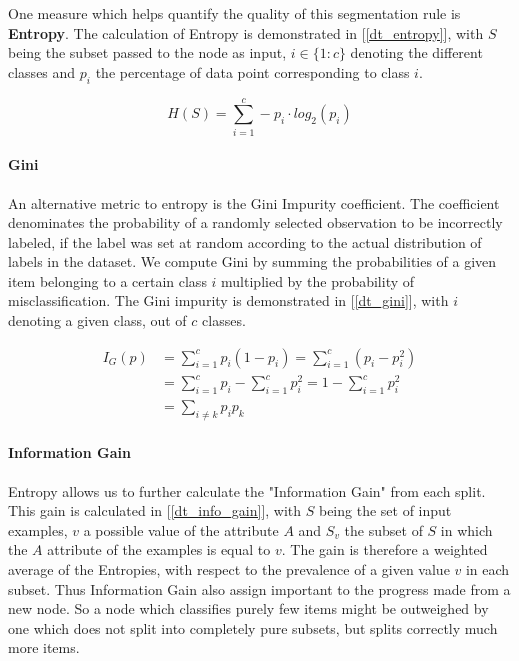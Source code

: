 		\par
		One measure which helps quantify the quality of this segmentation rule is \textbf{Entropy}. The calculation of Entropy is demonstrated in [\ref{dt_entropy}], with $ S $ being the subset passed to the node as input, $ i \in \{1:c \} $ denoting the different classes and $ p_i $ the percentage of data point corresponding to class $ i $. 
		
		\begin{equation}
			H(S) = \sum_{i=1}^c - p_i \cdot log_2 (p_i)
			\label{dt_entropy}
		\end{equation}
		
	 \paragraph{Gini}
	 	An alternative metric to entropy is the Gini Impurity coefficient. The coefficient denominates the probability of a randomly selected observation to be incorrectly labeled, if the label was set at random according to the actual distribution of labels in the dataset. We compute Gini by summing the probabilities of a given item belonging to a certain class $ i $ multiplied by the probability of misclassification. The Gini impurity is demonstrated in [\ref{dt_gini}], with $ i $ denoting a given class, out of $ c $ classes.
	 	
	 \begin{equation}
	 	\begin{aligned}
		 	I_G(p) &= \sum_{i=1}^c p_i(1-p_i) = \sum_{i=1}^c (p_i-p_i^2) \\  &=\sum_{i=1}^c p_i - \sum_{i=1}^c p_i^2 = 1 - \sum_{i=1}^c p_i^2 \\ &= \sum_{i \neq k} p_i p_k
	 	\end{aligned}
		\label{dt_gini}
	 \end{equation}
	 
	 \paragraph{Information Gain}	
	 	Entropy allows us to further calculate the "Information Gain" from each split. This gain is calculated in [\ref{dt_info_gain}], with $ S $ being the set of input examples, $ v $ a possible value of the attribute $ A $ and $ S_v $ the subset of $ S $ in which the $ A $ attribute of the examples is equal to $ v $. The gain is therefore a weighted average of the Entropies, with respect to the prevalence of a given value $ v $ in each subset. Thus Information Gain also assign important to the progress made from a new node. So a node which classifies purely few items might be outweighed by one which does not split into completely pure subsets, but splits correctly much more items.
	 
